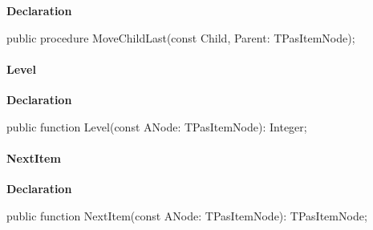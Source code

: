 \documentclass{report}
\newif\ifpdf
\begin{document}
\label{PasDoc_HierarchyTree.TStringCardinalTree-MoveChildLast}
\begin{list}{}{
\setlength{\itemindent}{0cm}
\setlength{\listparindent}{0cm}
\setlength{\leftmargin}{\evensidemargin}
\addtolength{\leftmargin}{\tmplength}
\settowidth{\labelsep}{X}
\addtolength{\leftmargin}{\labelsep}
\setlength{\labelwidth}{\tmplength}
}
\item[\textbf{Declaration}\hfill]
\ifpdf
\begin{flushleft}
\fi
\begin{ttfamily}
public procedure MoveChildLast(const Child, Parent: TPasItemNode);\end{ttfamily}

\ifpdf
\end{flushleft}
\fi

\end{list}
\paragraph*{Level}\hspace*{\fill}

\label{PasDoc_HierarchyTree.TStringCardinalTree-Level}
\begin{list}{}{
\setlength{\itemindent}{0cm}
\setlength{\listparindent}{0cm}
\setlength{\leftmargin}{\evensidemargin}
\addtolength{\leftmargin}{\tmplength}
\settowidth{\labelsep}{X}
\addtolength{\leftmargin}{\labelsep}
\setlength{\labelwidth}{\tmplength}
}
\item[\textbf{Declaration}\hfill]
\ifpdf
\begin{flushleft}
\fi
\begin{ttfamily}
public function Level(const ANode: TPasItemNode): Integer;\end{ttfamily}

\ifpdf
\end{flushleft}
\fi

\end{list}
\paragraph*{NextItem}\hspace*{\fill}

\label{PasDoc_HierarchyTree.TStringCardinalTree-NextItem}
\begin{list}{}{
\setlength{\itemindent}{0cm}
\setlength{\listparindent}{0cm}
\setlength{\leftmargin}{\evensidemargin}
\addtolength{\leftmargin}{\tmplength}
\settowidth{\labelsep}{X}
\addtolength{\leftmargin}{\labelsep}
\setlength{\labelwidth}{\tmplength}
}
\item[\textbf{Declaration}\hfill]
\ifpdf
\begin{flushleft}
\fi
\begin{ttfamily}
public function NextItem(const ANode: TPasItemNode): TPasItemNode;\end{ttfamily}

\ifpdf
\end{flushleft}
\fi

\end{list}
\end{document}
